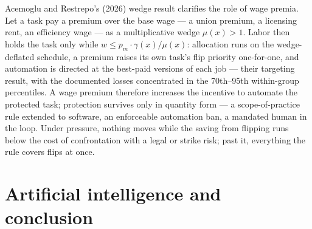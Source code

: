 \documentclass[12pt]{article}
\theoremstyle{plain}
\theoremstyle{definition}
\theoremstyle{remark}
\begin{document}
Acemoglu and Restrepo's (2026) wedge result clarifies the role of wage premia. Let a task pay a premium over the base wage --- a union premium, a licensing rent, an efficiency wage --- as a multiplicative wedge $\mu (x) > 1$. Labor then holds the task only while $w \le p_m\cdot \gamma (x)/\mu (x)$: allocation runs on the wedge-deflated schedule, a premium raises its own task's flip priority one-for-one, and automation is directed at the best-paid versions of each job --- their targeting result, with the documented losses concentrated in the 70th--95th within-group percentiles. A wage premium therefore increases the incentive to automate the protected task; protection survives only in quantity form --- a scope-of-practice rule extended to software, an enforceable automation ban, a mandated human in the loop. Under pressure, nothing moves while the saving from flipping runs below the cost of confrontation with a legal or strike risk; past it, everything the rule covers flips at once.

\section{Artificial intelligence and conclusion}\label{sec:ai}
\end{document}
